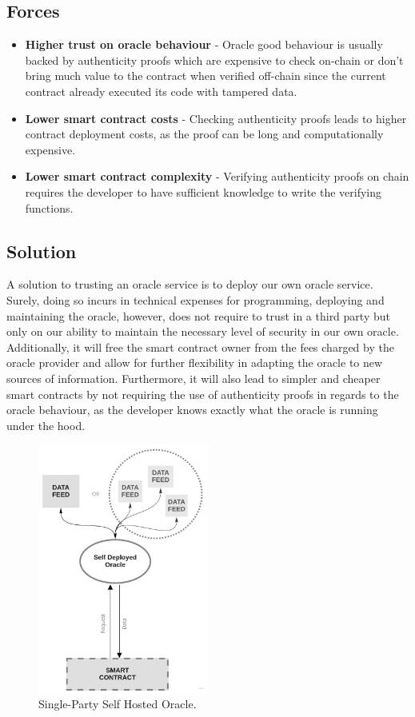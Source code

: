\subsection{Forces}
\begin{itemize}
  \item \textbf{Higher trust on oracle behaviour} - Oracle good behaviour is usually backed by authenticity proofs which are expensive to check on-chain or don't bring much value to the contract when verified off-chain since the current contract already executed its code with tampered data.
  \item \textbf{Lower smart contract costs} - Checking authenticity proofs leads to higher contract deployment costs, as the proof can be long and computationally expensive.
  \item \textbf{Lower smart contract complexity} - Verifying authenticity proofs on chain requires the developer to have sufficient knowledge to write the verifying functions.
\end{itemize}

\subsection{Solution}
A solution to trusting an oracle service is to deploy our own oracle service. Surely, doing so incurs in technical expenses for programming, deploying and maintaining the oracle, however, does not require to trust in a third party but only on our ability to maintain the necessary level of security in our own oracle. Additionally, it will free the smart contract owner from the fees charged by the oracle provider and allow for further flexibility in adapting the oracle to new sources of information. Furthermore, it will also lead to simpler and cheaper smart contracts by not requiring the use of authenticity proofs in regards to the oracle behaviour, as the developer knows exactly what the oracle is running under the hood.

\begin{figure}[t]
  \begin{center}
    \leavevmode
    \includegraphics[width=0.5\textwidth]{figures/oraclearch3.jpg}
    \caption{Single-Party Self Hosted Oracle.}
    \label{fig:/figures/SPSelfHostedOracle}
  \end{center}
\end{figure}


